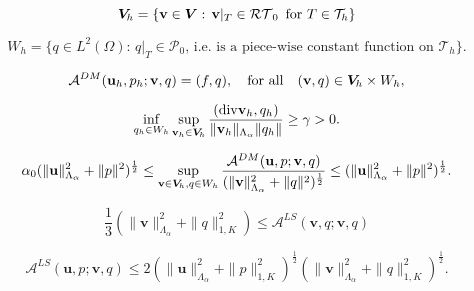 \documentclass[11pt]{article}
\begin{document}
\begin{equation}\label{space Vh}
{{\boldsymbol V}_{\hspace{-0.2mm}h}}=\{ {{\mathbf v}} \in {{\boldsymbol V}}: \, {{\mathbf v}} |_T \in {{\mathcal{RT}}_{{0}}} \,\,\, \mbox{for} \,\, T \in {\mathcal T}_h\} 
\end{equation}

\begin{equation}\label{space Wh}
W_h =\{ q \in L^2(\Omega): \, q|_{T} \in {\mathcal P}_0, 
\, \text{i.e.  is a piece-wise constant function on} \,\,  {\mathcal T}_h\}.
\end{equation}

\begin{equation}\label{eq:dual_mixed_FEM}
{{\mathcal A}}^{DM}({{\mathbf u}}_h,p_h; {{\mathbf v}},q)=(f,q), 
\quad \mbox{for all}\quad ({{\mathbf v}}, q) \in {{\boldsymbol V}_{\hspace{-0.2mm}h}} \times W_h,
\end{equation}

\begin{equation}\label{inf_sup_fin_set}
 \inf_{q_h\in W_h}\sup_{{{\mathbf v}}_h\in{{\boldsymbol V}_{\hspace{-0.2mm}h}}}
\frac{({\operatorname{div}} {{\mathbf v}}_h,q_h)}{\Vert {{\mathbf v}}_h\Vert_{\Lambda_{{\alpha}}} \Vert q_h\Vert}\ge 
\gamma >0 . 
\end{equation}

\begin{equation}\label{DM-Fem_stability}
\alpha_0 ( \|{{\mathbf u}}\|^2_{\Lambda_{{\alpha}}} +\|p\|^2)^\frac12 \le \sup_{{{\mathbf v}} \in{{\boldsymbol V}_{\hspace{-0.2mm}h}}, q\in W_h} 
\frac{{{\mathcal A}}^{DM}({{\mathbf u}},p; {{\mathbf v}},q) }{(\|{{\mathbf v}}\|^2_{\Lambda_{{\alpha}}} +\|q\|^2)^\frac12} \le 
( \|{{\mathbf u}}\|^2_{\Lambda_{{\alpha}}} +\|p\|^2)^\frac12.
\end{equation}

\begin{equation}\label{LS-Fem_coercivity}
\frac13 ( \|{{\mathbf v}}\|^2_{\Lambda_{{\alpha}}} +\|q\|^2_{1,K})  \le {{\mathcal A}}^{LS}({{\mathbf v}},q; {{\mathbf v}},q)   
\end{equation}

\begin{equation}\label{LS-FEM-continuity}
 {{\mathcal A}}^{LS}({{\mathbf u}},p; {{\mathbf v}},q)  \le 2
(\|{{\mathbf u}}\|^2_{\Lambda_{{\alpha}}} +\|p\|^2_{1,K})^\frac12
( \|{{\mathbf v}}\|^2_{\Lambda_{{\alpha}}} +\|q\|^2_{1,K})^\frac12.
\end{equation}
\end{document}
